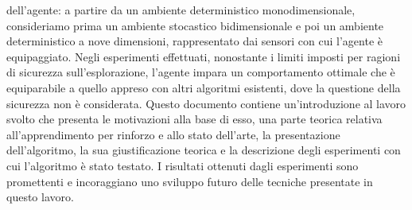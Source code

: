 dell'agente: a partire da un ambiente deterministico monodimensionale, consideriamo prima un ambiente stocastico bidimensionale e poi un ambiente deterministico a nove dimensioni, rappresentato dai sensori con cui l'agente è equipaggiato. Negli esperimenti effettuati, nonostante i limiti imposti per ragioni di sicurezza sull'esplorazione, l'agente impara un comportamento ottimale che è equiparabile a quello appreso con altri algoritmi esistenti, dove la questione della sicurezza non è considerata. Questo documento contiene un'introduzione al lavoro svolto che presenta le motivazioni alla base di esso, una parte teorica relativa all'apprendimento per rinforzo e allo stato dell'arte, la presentazione dell'algoritmo, la sua giustificazione teorica e la descrizione degli esperimenti con cui l'algoritmo è stato testato. I risultati ottenuti dagli esperimenti sono promettenti e incoraggiano uno sviluppo futuro delle tecniche presentate in questo lavoro.

\endgroup

